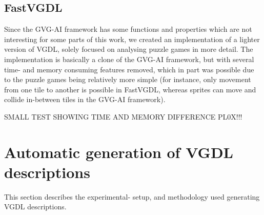 \documentclass[a4paper,titlepage,final, twoside]{report}
\begin{document}
\section{FastVGDL}
Since the GVG-AI framework has some functions and properties which are not interesting for some parts of this work, we created an implementation of a lighter version of VGDL, solely focused on analysing puzzle games in more detail.
The implementation is basically a clone of the GVG-AI framework, but with several time- and memory consuming features removed, which in part was possible due to the puzzle games being relatively more simple (for instance, only movement from one tile to another is possible in FastVGDL, whereas sprites can move and collide in-between tiles in the GVG-AI framework).

SMALL TEST SHOWING TIME AND MEMORY DIFFERENCE PL0X!!!

 



\chapter{Automatic generation of VGDL descriptions}
This section describes the experimental- setup, and methodology used generating VGDL descriptions.
\end{document}

